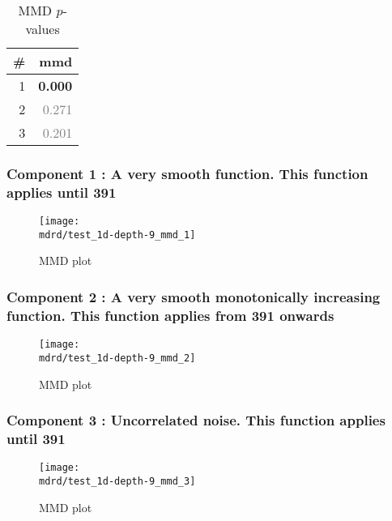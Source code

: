 \documentclass{article} %
\begin{document}
\begin{table}[htb]
\begin{center}
{\small
\begin{tabular}{|r|r|}
\hline
\bf{\#} & {mmd}\\
\hline

1 & \textbf{0.000}\\

2 & \textcolor{gray}{0.271}\\

3 & \textcolor{gray}{0.201}\\

\hline
\end{tabular}
\caption{
MMD $p$-values
}
\label{table:mmd}
}
\end{center}
\end{table}

\subsubsection{Component 1 : A very smooth function. This function applies until  391}

\begin{figure}[H]
\newcommand{\wmgd}{0.5\columnwidth}
\newcommand{\hmgd}{3.0cm}
\newcommand{\mdrd}{test_1d-depth-9}
\newcommand{\mbm}{\hspace{-0.3cm}}
\texttt{[image: \\mdrd/test\_1d-depth-9\_mmd\_1]}
\caption{
MMD plot}
\label{fig:mmd1}
\end{figure}

\subsubsection{Component 2 : A very smooth monotonically increasing function. This function applies from  391 onwards}

\begin{figure}[H]
\newcommand{\wmgd}{0.5\columnwidth}
\newcommand{\hmgd}{3.0cm}
\newcommand{\mdrd}{test_1d-depth-9}
\newcommand{\mbm}{\hspace{-0.3cm}}
\texttt{[image: \\mdrd/test\_1d-depth-9\_mmd\_2]}
\caption{
MMD plot}
\label{fig:mmd2}
\end{figure}

\subsubsection{Component 3 : Uncorrelated noise. This function applies until  391}

\begin{figure}[H]
\newcommand{\wmgd}{0.5\columnwidth}
\newcommand{\hmgd}{3.0cm}
\newcommand{\mdrd}{test_1d-depth-9}
\newcommand{\mbm}{\hspace{-0.3cm}}
\texttt{[image: \\mdrd/test\_1d-depth-9\_mmd\_3]}
\caption{
MMD plot}
\label{fig:mmd3}
\end{figure}
\end{document}
